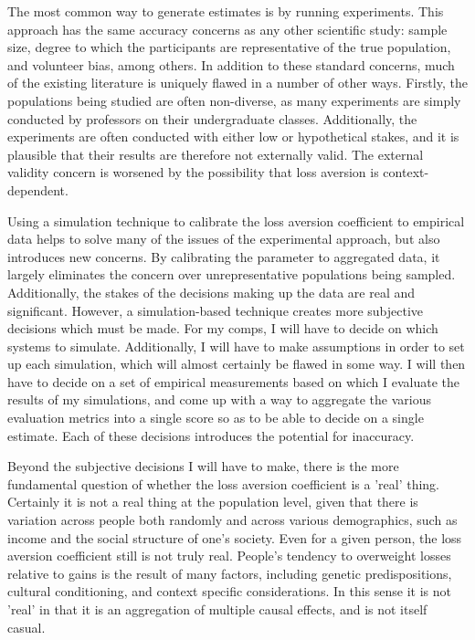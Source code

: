 \documentclass[10pt,twocolumn]{article}
\begin{document}
    The most common way to generate estimates is by running experiments. This approach has the same accuracy concerns as any other scientific study: sample size, degree to which the participants are representative of the true population, and volunteer bias, among others. In addition to these standard concerns, much of the existing literature is uniquely flawed in a number of other ways. Firstly, the populations being studied are often non-diverse, as many experiments are simply conducted by professors on their undergraduate classes. Additionally, the experiments are often conducted with either low or hypothetical stakes, and it is plausible that their results are therefore not externally valid. The external validity concern is worsened by the possibility that loss aversion is context-dependent.

    Using a simulation technique to calibrate the loss aversion coefficient to empirical data helps to solve many of the issues of the experimental approach, but also introduces new concerns. By calibrating the parameter to aggregated data, it largely eliminates the concern over unrepresentative populations being sampled. Additionally, the stakes of the decisions making up the data are real and significant. However, a simulation-based technique creates more subjective decisions which must be made. For my comps, I will have to decide on which systems to simulate. Additionally, I will have to make assumptions in order to set up each simulation, which will almost certainly be flawed in some way. I will then have to decide on a set of empirical measurements based on which I evaluate the results of my simulations, and come up with a way to aggregate the various evaluation metrics into a single score so as to be able to decide on a single estimate. Each of these decisions introduces the potential for inaccuracy.

    Beyond the subjective decisions I will have to make, there is the more fundamental question of whether the loss aversion coefficient is a 'real' thing. Certainly it is not a real thing at the population level, given that there is variation across people both randomly and across various demographics, such as income and the social structure of one's society. Even for a given person, the loss aversion coefficient still is not truly real. People's tendency to overweight losses relative to gains is the result of many factors, including genetic predispositions, cultural conditioning, and context specific considerations. In this sense it is not 'real' in that it is an aggregation of multiple causal effects, and is not itself casual. 
\end{document}
